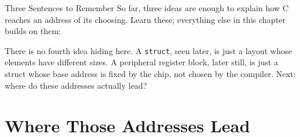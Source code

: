 \documentclass[9pt,aspectratio=169,xcolor=table]{beamer}
\begin{document}
\begin{frame}{Three Sentences to Remember}
    \leavevmode
    So far, three ideas are enough to explain how C reaches an address of
    its choosing. Learn these; everything else in this chapter builds on
    them:

    \vspace{4mm}
    \begin{center}
    \end{center}

    \vspace{2mm}
    {\small There is no fourth idea hiding here. A \texttt{struct},
    seen later, is just a layout whose elements have different sizes.
    A peripheral register block, later still, is just a struct whose
    base address is fixed by the chip, not chosen by the compiler.
    Next: \alert{where do these addresses actually lead?}}
\end{frame}


\section{Where Those Addresses Lead}
\end{document}
